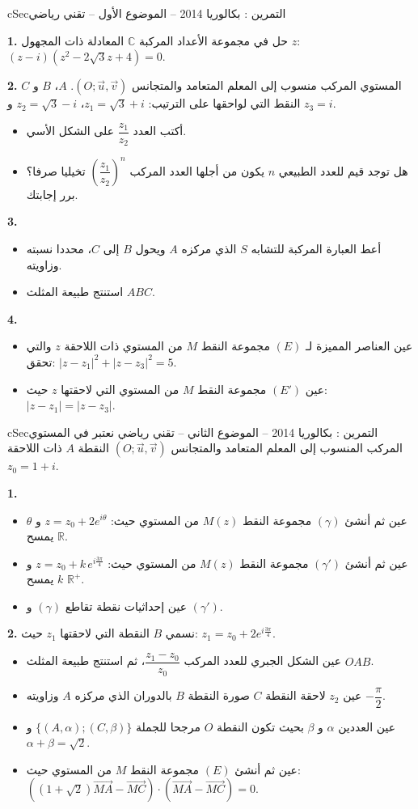 \documentclass[12pt,a4paper]{article}
\newenvironment{BOX}[2]{\begin{otherlanguage}{english}\begin{arbox}{#1}{#2}}{\end{arbox}\end{otherlanguage}}
\newcounter{exo}
\newenvironment{tamrin}[1]{\stepcounter{exo}\begin{BOX}{cSec}{التمرين \theexo: #1}}{\end{BOX}}
\newenvironment{sq}{\begin{itemize}[leftmargin=2.4em,itemsep=3pt]}{\end{itemize}}
\newcommand{\qa}{\item[(أ)]}\newcommand{\qb}{\item[(ب)]}\newcommand{\qc}{\item[(جـ)]}\newcommand{\qd}{\item[(د)]}\newcommand{\qe}{\item[(هـ)]}
\newcommand{\QQ}[1]{\par\smallskip\textbf{#1.} }
\begin{document}
\begin{tamrin}{بكالوريا 2014 -- الموضوع الأول -- تقني رياضي}
\QQ{1} حل في مجموعة الأعداد المركبة $\mathbb{C}$ المعادلة ذات المجهول $z$: $(z-i)(z^2-2\sqrt3z+4)=0$.

\QQ{2} المستوي المركب منسوب إلى المعلم المتعامد والمتجانس $(O;\vec u,\vec v)$. $A$، $B$ و $C$ النقط التي لواحقها على الترتيب: $z_1=\sqrt3+i$، $z_2=\sqrt3-i$ و $z_3=i$.
\begin{sq}
\qa أكتب العدد $\dfrac{z_1}{z_2}$ على الشكل الأسي.
\qb هل توجد قيم للعدد الطبيعي $n$ يكون من أجلها العدد المركب $\left(\dfrac{z_1}{z_2}\right)^n$ تخيليا صرفا؟ برر إجابتك.
\end{sq}
\QQ{3}
\begin{sq}
\qa أعط العبارة المركبة للتشابه $S$ الذي مركزه $A$ ويحول $B$ إلى $C$، محددا نسبته وزاويته.
\qb استنتج طبيعة المثلث $ABC$.
\end{sq}
\QQ{4}
\begin{sq}
\qa عين العناصر المميزة لـ $(E)$ مجموعة النقط $M$ من المستوي ذات اللاحقة $z$ والتي تحقق: $|z-z_1|^2+|z-z_3|^2=5$.
\qb عين $(E')$ مجموعة النقط $M$ من المستوي التي لاحقتها $z$ حيث: $|z-z_1|=|z-z_3|$.
\end{sq}
\end{tamrin}

\begin{tamrin}{بكالوريا 2014 -- الموضوع الثاني -- تقني رياضي}
نعتبر في المستوي المركب المنسوب إلى المعلم المتعامد والمتجانس $(O;\vec u,\vec v)$ النقطة $A$ ذات اللاحقة $z_0=1+i$.

\QQ{1}
\begin{sq}
\qa عين ثم أنشئ $(\gamma)$ مجموعة النقط $M(z)$ من المستوي حيث: $z=z_0+2e^{i\theta}$ و $\theta$ يمسح $\mathbb{R}$.
\qb عين ثم أنشئ $(\gamma')$ مجموعة النقط $M(z)$ من المستوي حيث: $z=z_0+k\,e^{i\frac{3\pi}{4}}$ و $k$ يمسح $\mathbb{R}^+$.
\qc عين إحداثيات نقطة تقاطع $(\gamma)$ و $(\gamma')$.
\end{sq}
\QQ{2} نسمي $B$ النقطة التي لاحقتها $z_1$ حيث: $z_1=z_0+2e^{i\frac{3\pi}{4}}$.
\begin{sq}
\qa عين الشكل الجبري للعدد المركب $\dfrac{z_1-z_0}{z_0}$، ثم استنتج طبيعة المثلث $OAB$.
\qb عين $z_2$ لاحقة النقطة $C$ صورة النقطة $B$ بالدوران الذي مركزه $A$ وزاويته $-\dfrac{\pi}{2}$.
\qc عين العددين $\alpha$ و $\beta$ بحيث تكون النقطة $O$ مرجحا للجملة $\{(A,\alpha);(C,\beta)\}$ و $\alpha+\beta=\sqrt2$.
\qd عين ثم أنشئ $(E)$ مجموعة النقط $M$ من المستوي حيث: $\left((1+\sqrt2)\overrightarrow{MA}-\overrightarrow{MC}\right)\cdot\left(\overrightarrow{MA}-\overrightarrow{MC}\right)=0$.
\end{sq}
\end{tamrin}
\end{document}
